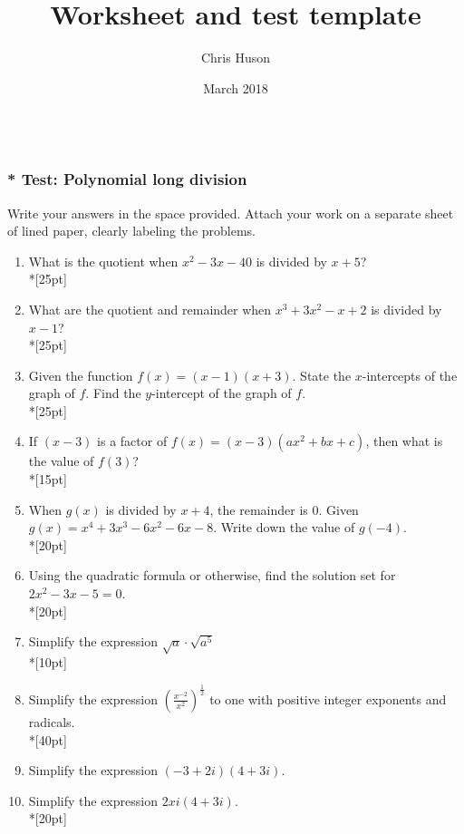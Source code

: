 \documentclass[12pt, oneside]{article}
\title{Worksheet and test template}
\author{Chris Huson}
\date{March 2018}
\begin{document}
\subsubsection*{\\* Test: Polynomial long division}
Write your answers in the space provided. Attach your work on a separate sheet of lined paper, clearly labeling the problems.

\begin{enumerate}



\item What is the quotient when $x^2-3x-40$ is divided by $x + 5$?\\*[25pt]

\item What are the quotient and remainder when $x^3+3x^2-x+2$ is divided by $x - 1$?\\*[25pt]

\item Given the function $f(x)=(x-1)(x+3)$. State the $x$-intercepts of the graph of $f$. Find the $y$-intercept of the graph of $f$.\\*[25pt]


\item If $(x-3)$ is a factor of $f(x)=(x-3)(ax^2+bx+c)$, then what is the value of $f(3)$?\\*[15pt]

\item When $g(x)$ is divided by $x+4$, the remainder is 0. Given $g(x)=x^4+3x^3- 6x^2- 6x-8$. Write down the value of $g(-4)$.\\*[20pt]

\item Using the quadratic formula or otherwise, find the solution set for $2x^2-3x-5=0$.\\*[20pt]

\item Simplify the expression $\sqrt{a} \cdot \sqrt{a^5}$ \\*[10pt]

\item Simplify the expression $\displaystyle \left( \frac{x^{-2}}{x^2} \right)^{\frac{1}{2}}$ to one with positive integer exponents and radicals.\\*[40pt]

\item Simplify the expression $(-3+2i)(4+3i)$.

\item Simplify the expression $2xi(4+3i)$.\\*[20pt]


\end{enumerate}
\end{document}
